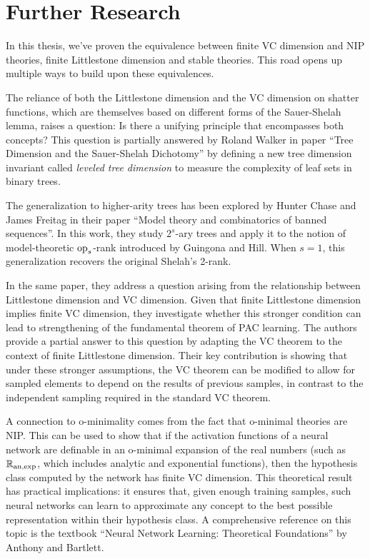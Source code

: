 \newpage

\section{Further Research}
In this thesis, we've proven the equivalence between finite VC dimension and NIP theories, finite Littlestone dimension and stable theories. This road opens up multiple ways to build upon these equivalences.

\begin{outline}
    \1 The reliance of both the Littlestone dimension and the VC dimension on shatter functions, which are themselves based on different forms of the Sauer-Shelah lemma, raises a question: Is there a unifying principle that encompasses both concepts?
     This question is partially answered by Roland Walker in paper \enquote{Tree Dimension and the Sauer-Shelah Dichotomy} by defining a new tree dimension invariant called \emph{leveled tree dimension} to measure the complexity of leaf sets in binary trees.

    \1 The generalization to higher-arity trees has been explored by Hunter Chase and James Freitag in their paper \enquote{Model theory and combinatorics of banned sequences}. 
     In this work, they study $2^s$-ary trees and apply it to the notion of model-theoretic $\operatorname{op}_s$-rank introduced by Guingona and Hill. When $s=1$, this generalization recovers the original Shelah's 2-rank.

    \1 In the same paper, they address a question arising from the relationship between Littlestone dimension and VC dimension. Given that finite Littlestone dimension implies finite VC dimension, they investigate whether this stronger condition can lead to strengthening of the fundamental theorem of PAC learning. The authors provide a partial answer to this question by adapting the VC theorem to the context of finite Littlestone dimension. Their key contribution is showing that under these stronger assumptions, the VC theorem can be modified to allow for sampled elements to depend on the results of previous samples, in contrast to the independent sampling required in the standard VC theorem.

    \1 A connection to o-minimality comes from the fact that o-minimal theories are NIP. This can be used to show that if the activation functions of a neural network are definable in an o-minimal expansion of the real numbers (such as $\mathbb{R}_{\text{an,exp}}$, which includes analytic and exponential functions), then the hypothesis class computed by the network has finite VC dimension. This theoretical result has practical implications: it ensures that, given enough training samples, such neural networks can learn to approximate any concept to the best possible representation within their hypothesis class. A comprehensive reference on this topic is the textbook \enquote{Neural Network Learning: Theoretical Foundations} by Anthony and Bartlett. 


\end{outline}
